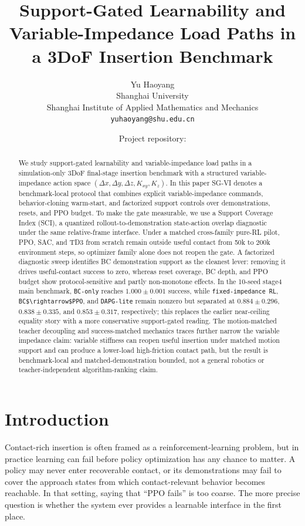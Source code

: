 ﻿\documentclass[11pt]{article}
\title{Support-Gated Learnability and Variable-Impedance Load Paths in a 3DoF Insertion Benchmark}
\author{Yu Haoyang\\Shanghai University\\Shanghai Institute of Applied Mathematics and Mechanics\\\texttt{yuhaoyang@shu.edu.cn}}
\date{\small Project repository: \repositoryurl}
\newcommand{\code}[1]{\nolinkurl{#1}}
\begin{document}
\maketitle

\begin{abstract}
We study support-gated learnability and variable-impedance load paths in a simulation-only 3DoF
final-stage insertion benchmark with a structured variable-impedance action space
$(\Delta x, \Delta y, \Delta z, K_{xy}, K_z)$. In this paper SG-VI denotes a benchmark-local
protocol that combines explicit variable-impedance commands, behavior-cloning warm-start, and
factorized support controls over demonstrations, resets, and PPO budget. To make the gate
measurable, we use a Support Coverage Index (SCI), a quantized rollout-to-demonstration
state-action overlap diagnostic under the same relative-frame interface. Under a matched
cross-family pure-RL pilot, PPO, SAC, and TD3 from scratch remain outside useful contact from 50k
to 200k environment steps, so optimizer family alone does not reopen the gate. A factorized
diagnostic sweep identifies BC demonstration support as the cleanest lever: removing it drives
useful-contact success to zero, whereas reset coverage, BC depth, and PPO budget show
protocol-sensitive and partly non-monotone effects. In the 10-seed stage4 main benchmark,
\code{BC-only} reaches $1.000 \pm 0.001$ success, while \code{fixed-impedance RL},
\code{BC$\rightarrow$PPO}, and \code{DAPG-lite} remain nonzero but separated at
$0.884 \pm 0.296$, $0.838 \pm 0.335$, and $0.853 \pm 0.317$, respectively; this replaces the
earlier near-ceiling equality story with a more conservative support-gated reading. The
motion-matched teacher decoupling and success-matched mechanics traces further narrow the variable
impedance claim: variable stiffness can reopen useful insertion under matched motion support and can
produce a lower-load high-friction contact path, but the result is benchmark-local and
matched-demonstration bounded, not a general robotics or teacher-independent algorithm-ranking
claim.
\end{abstract}

\section{Introduction}

Contact-rich insertion is often framed as a reinforcement-learning problem, but in practice
learning can fail before policy optimization has any chance to matter. A policy may never enter
recoverable contact, or its demonstrations may fail to cover the approach states from which
contact-relevant behavior becomes reachable. In that setting, saying that ``PPO fails'' is too
coarse. The more precise question is whether the system ever provides a learnable interface in the
first place.
\end{document}
